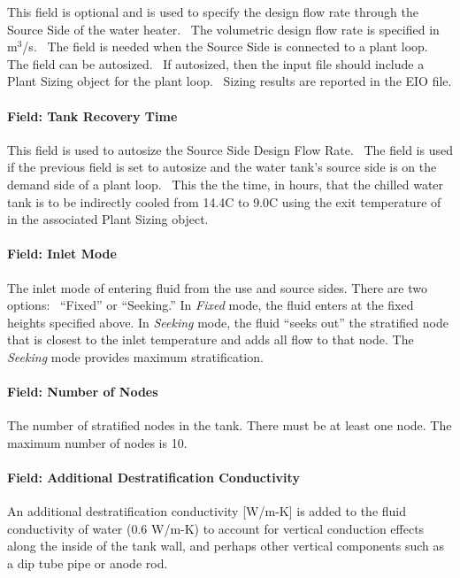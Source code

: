 This field is optional and is used to specify the design flow rate through the Source Side of the water heater.~ The volumetric design flow rate is specified in m\(^{3}\)/s.~ The field is needed when the Source Side is connected to a plant loop.~ The field can be autosized.~ If autosized, then the input file should include a Plant Sizing object for the plant loop.~ Sizing results are reported in the EIO file.

\paragraph{Field: Tank Recovery Time}\label{field-tank-recovery-time-1}

This field is used to autosize the Source Side Design Flow Rate.~ The field is used if the previous field is set to autosize and the water tank's source side is on the demand side of a plant loop.~ This the the time, in hours, that the chilled water tank is to be indirectly cooled from 14.4C to 9.0C using the exit temperature of in the associated Plant Sizing object.

\paragraph{Field: Inlet Mode}\label{field-inlet-mode}

The inlet mode of entering fluid from the use and source sides. There are two options:~ ``Fixed'' or ``Seeking.'' In \emph{Fixed} mode, the fluid enters at the fixed heights specified above. In \emph{Seeking} mode, the fluid ``seeks out'' the stratified node that is closest to the inlet temperature and adds all flow to that node. The \emph{Seeking} mode provides maximum stratification.

\paragraph{Field: Number of Nodes}\label{field-number-of-nodes}

The number of stratified nodes in the tank. There must be at least one node. The maximum number of nodes is 10.

\paragraph{Field: Additional Destratification Conductivity}\label{field-additional-destratification-conductivity}

An additional destratification conductivity {[}W/m-K{]} is added to the fluid conductivity of water (0.6 W/m-K) to account for vertical conduction effects along the inside of the tank wall, and perhaps other vertical components such as a dip tube pipe or anode rod.

